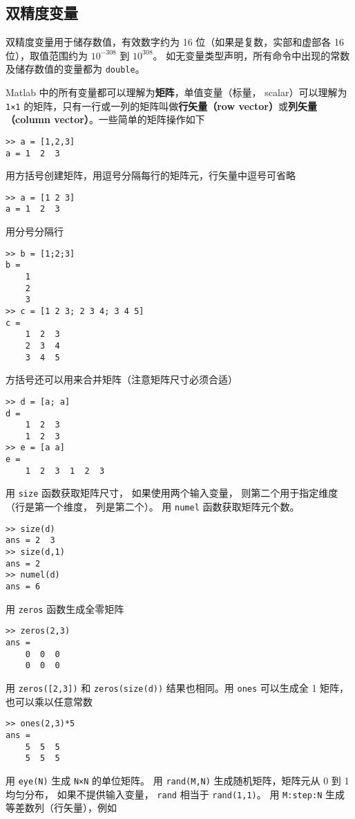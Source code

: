 \subsection{双精度变量}

双精度变量用于储存数值，有效数字约为 16 位（如果是复数，实部和虚部各 16 位），取值范围约为 $10^{-308}$ 到 $10^{308}$。 如无变量类型声明，所有命令中出现的常数及储存数值的变量都为 \verb|double|。

Matlab 中的所有变量都可以理解为\textbf{矩阵}，单值变量（标量， scalar）可以理解为 \verb|1×1| 的矩阵，只有一行或一列的矩阵叫做\textbf{行矢量（row vector）}或\textbf{列矢量（column vector）}。一些简单的矩阵操作如下
\begin{lstlisting}[language=matlabC]
>> a = [1,2,3]
a = 1  2  3
\end{lstlisting}
用方括号创建矩阵，用逗号分隔每行的矩阵元，行矢量中逗号可省略%
\begin{lstlisting}[language=matlabC]
>> a = [1 2 3]
a = 1  2  3
\end{lstlisting}
用分号分隔行
\begin{lstlisting}[language=matlabC]
>> b = [1;2;3]
b =
    1
    2
    3
>> c = [1 2 3; 2 3 4; 3 4 5]
c =
    1  2  3
    2  3  4
    3  4  5
\end{lstlisting}
方括号还可以用来合并矩阵（注意矩阵尺寸必须合适）
\begin{lstlisting}[language=matlabC]
>> d = [a; a]
d =
    1  2  3
    1  2  3
>> e = [a a]
e =
    1  2  3  1  2  3
\end{lstlisting}
用 \verb|size| 函数获取矩阵尺寸， 如果使用两个输入变量， 则第二个用于指定维度（行是第一个维度， 列是第二个）。 用 \verb|numel| 函数获取矩阵元个数。
\begin{lstlisting}[language=matlabC]
>> size(d)
ans = 2  3
>> size(d,1)
ans = 2
>> numel(d)
ans = 6
\end{lstlisting}
用 \verb|zeros| 函数生成全零矩阵
\begin{lstlisting}[language=matlabC]
>> zeros(2,3)
ans =
    0  0  0
    0  0  0
\end{lstlisting}
用 \verb|zeros([2,3])| 和 \verb|zeros(size(d))| 结果也相同。用 \verb|ones| 可以生成全 1 矩阵，也可以乘以任意常数
\begin{lstlisting}[language=matlabC]
>> ones(2,3)*5
ans =
    5  5  5
    5  5  5
\end{lstlisting}
用 \verb|eye(N)| 生成 \verb|N×N| 的单位矩阵。 用 \verb|rand(M,N)| 生成随机矩阵，矩阵元从 0 到 1 均匀分布， 如果不提供输入变量， \verb|rand| 相当于 \verb|rand(1,1)|。 用 \verb|M:step:N| 生成等差数列（行矢量），例如
